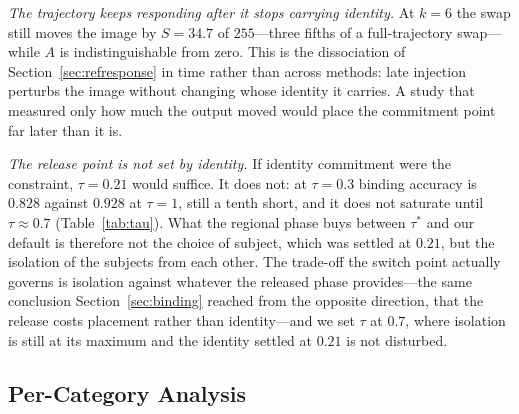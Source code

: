\documentclass[10pt,twocolumn,letterpaper]{article}
\begin{document}
\noindent\textit{The trajectory keeps responding after it stops carrying
identity.}
At $k{=}6$ the swap still moves the image by $S{=}34.7$ of $255$---three
fifths of a full-trajectory swap---while $A$ is indistinguishable from zero.
This is the dissociation of Section~\ref{sec:refresponse} in time rather than
across methods: late injection perturbs the image without changing whose
identity it carries.  A study that measured only how much the output moved
would place the commitment point far later than it is.

\noindent\textit{The release point is not set by identity.}
If identity commitment were the constraint, $\tau{=}0.21$ would suffice.  It
does not: at $\tau{=}0.3$ binding accuracy is $0.828$ against $0.928$ at
$\tau{=}1$, still a tenth short, and it does not saturate until
$\tau{\approx}0.7$ (Table~\ref{tab:tau}).  What the regional phase buys
between $\tau^{*}$ and our default is therefore not the choice of subject,
which was settled at $0.21$, but the isolation of the subjects from each
other.  The trade-off the switch point actually governs is isolation against
whatever the released phase provides---the same conclusion
Section~\ref{sec:binding} reached from the opposite direction, that the
release costs placement rather than identity---and we set $\tau$ at $0.7$,
where isolation is still at its maximum and the identity settled at $0.21$ is
not disturbed.



\subsection{Per-Category Analysis}

\begin{table}[htbp]
\centering
\caption{%
  \textbf{Per-category ArcFace identity} on Mixed-Eval-v1
  (Ours at the default $\tau{=}0.7$).
  Person: portrait samples; Mixed: scene samples with faces.
  Detect rate shows fraction of regions where ArcFace detected a face.
}
\label{tab:percategory}
\end{table}
\end{document}
